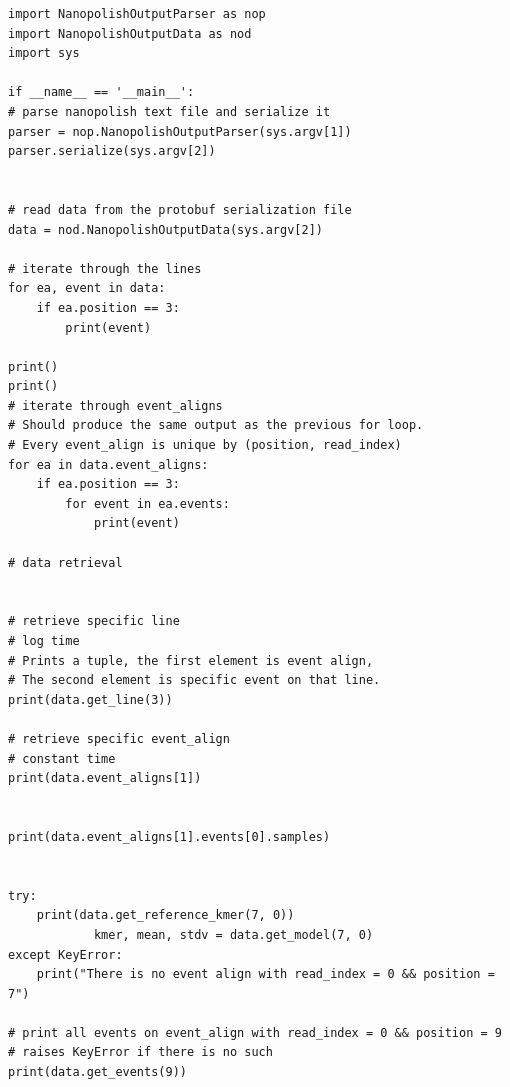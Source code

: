 \documentclass[times, utf, seminar]{fer}
\begin{document}
\begin{lstlisting}
import NanopolishOutputParser as nop
import NanopolishOutputData as nod
import sys

if __name__ == '__main__':
# parse nanopolish text file and serialize it
parser = nop.NanopolishOutputParser(sys.argv[1])
parser.serialize(sys.argv[2])


# read data from the protobuf serialization file
data = nod.NanopolishOutputData(sys.argv[2])

# iterate through the lines
for ea, event in data:
	if ea.position == 3:
		print(event)

print()
print()
# iterate through event_aligns
# Should produce the same output as the previous for loop.
# Every event_align is unique by (position, read_index)
for ea in data.event_aligns:
	if ea.position == 3:
		for event in ea.events:
			print(event)

# data retrieval


# retrieve specific line
# log time
# Prints a tuple, the first element is event align,
# The second element is specific event on that line.
print(data.get_line(3))

# retrieve specific event_align
# constant time
print(data.event_aligns[1])


print(data.event_aligns[1].events[0].samples)


try:
	print(data.get_reference_kmer(7, 0))
			kmer, mean, stdv = data.get_model(7, 0)
except KeyError:
	print("There is no event align with read_index = 0 && position = 7")

# print all events on event_align with read_index = 0 && position = 9
# raises KeyError if there is no such
print(data.get_events(9))
\end{lstlisting}
\newpage






\end{document}
